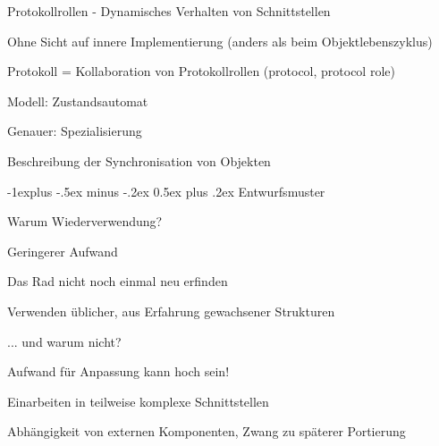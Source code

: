 \documentclass[a4paper]{article}
\makeatletter
\renewcommand{\subsection}{\@startsection{subsection}{2}{0mm}%
                                {-1explus -.5ex minus -.2ex}%
                                {0.5ex plus .2ex}%
                                {\normalfont\normalsize\bfseries}}
\makeatother
\begin{document}
\begin{multicols}{3}
  Protokollrollen - Dynamisches Verhalten von Schnittstellen
  \begin{itemize*}
    \item Ohne Sicht auf innere Implementierung (anders als beim Objektlebenszyklus)
    \item Protokoll = Kollaboration von Protokollrollen (protocol, protocol role)
    \item Modell: Zustandsautomat
          \begin{itemize*}
            \item Genauer: Spezialisierung
            \item Beschreibung der Synchronisation von Objekten
          \end{itemize*}
  \end{itemize*}

  \subsection{Entwurfsmuster}
  \begin{itemize*}
    \item Warum Wiederverwendung?
          \begin{itemize*}
            \item Geringerer Aufwand
            \item Das Rad nicht noch einmal neu erfinden
            \item Verwenden üblicher, aus Erfahrung gewachsener Strukturen
          \end{itemize*}
    \item ... und warum nicht?
          \begin{itemize*}
            \item Aufwand für Anpassung kann hoch sein!
            \item Einarbeiten in teilweise komplexe Schnittstellen
            \item Abhängigkeit von externen Komponenten, Zwang zu späterer Portierung
          \end{itemize*}
  \end{itemize*}


\end{multicols}
\end{document}
